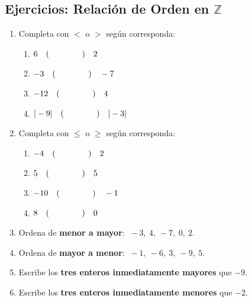 \documentclass[12pt, letterpaper]{article}
\newcommand{\Z}{\mathbb{Z}}
\begin{document}
\subsection{Ejercicios: Relación de Orden en $\Z$}

\begin{enumerate}[leftmargin=*, start=15]
  \item \facil{} Completa con $<$ o $>$ según corresponda:
        \begin{enumerate}[label=\alph*)]
          \item $6 \quad (\hspace{1.4cm}) \quad 2$
          \item $-3 \quad (\hspace{1.4cm}) \quad -7$
          \item $-12 \quad (\hspace{1.4cm}) \quad 4$
          \item $|-9| \quad (\hspace{1.4cm}) \quad |-3|$
        \end{enumerate}

  \item \facil{} Completa con $\leq$ o $\geq$ según corresponda:
        \begin{enumerate}[label=\alph*)]
          \item $-4 \quad (\hspace{1.4cm}) \quad 2$
          \item $5 \quad (\hspace{1.4cm}) \quad 5$
          \item $-10 \quad (\hspace{1.4cm}) \quad -1$
          \item $8 \quad (\hspace{1.4cm}) \quad 0$
        \end{enumerate}

  \item \facil{} Ordena de \textbf{menor a mayor}: $\ -3, \ 4, \ -7, \ 0, \ 2$.

  \item \facil{} Ordena de \textbf{mayor a menor}: $\ -1, \ -6, \ 3, \ -9, \ 5$.

  \item \medio{} Escribe los \textbf{tres enteros inmediatamente mayores} que $-9$.

  \item \medio{} Escribe los \textbf{tres enteros inmediatamente menores} que $-2$.


\end{enumerate}
\end{document}
